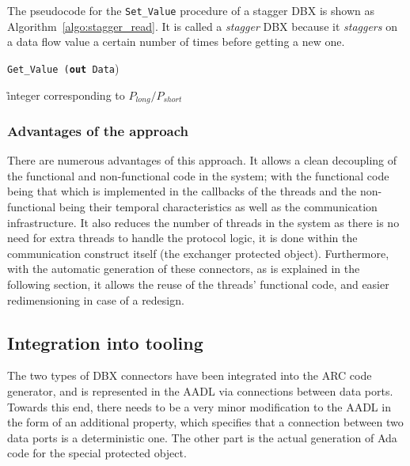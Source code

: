 The pseudocode for the \texttt{Set\_Value} procedure of a stagger DBX
is shown as Algorithm~\ref{algo:stagger_read}. It is called a
\emph{stagger} DBX because it \emph{staggers} on a data flow value a
certain number of times before getting a new one.

\begin{algorithm}
\caption{\texttt{Get\_Value (\textbf{out} Data})}
\label{algo:stagger_read}
\r{integer corresponding to $P_{long}/P_{short}$}
\SetLine
{}
\end{algorithm}

\subsubsection{Advantages of the approach}
There are numerous advantages of this approach. It allows a clean
decoupling of the functional and non-functional code in the system;
with the functional code being that which is implemented in the
callbacks of the threads and the non-functional being their temporal
characteristics as well as the communication infrastructure. It also
reduces the number of threads in the system as there is no need for
extra threads to handle the protocol logic, it is done within the
communication construct itself (the exchanger protected
object). Furthermore, with the automatic generation of these
connectors, as is explained in the following section, it allows the
reuse of the threads' functional code, and easier redimensioning in
case of a redesign.

\subsection{Integration into tooling}
\label{sec:implem}
The two types of DBX connectors have been integrated into the ARC code
generator, and is represented in the AADL via connections between data
ports. Towards this end, there needs to be a very minor modification
to the AADL in the form of an additional property, which specifies
that a connection between two data ports is a deterministic one. The
other part is the actual generation of Ada code for the special
protected object.

